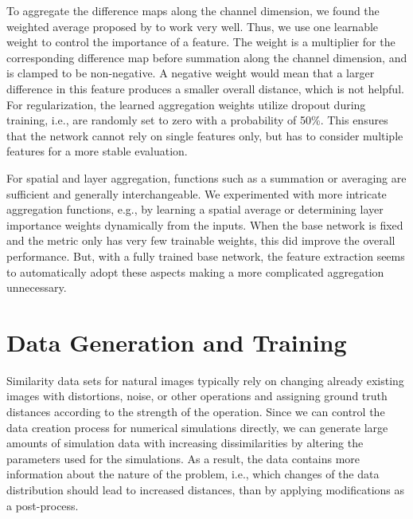 \documentclass{article}
\begin{document}
To aggregate the difference maps along the channel dimension, we found the weighted average proposed by \citeauthor{zhang2018} to work very well. Thus, we use one learnable weight to control the importance of a feature. The weight is a multiplier for the corresponding difference map before summation along the channel dimension, and is clamped to be non-negative. A negative weight would mean that a larger difference in this feature produces a smaller overall distance, which is not helpful. For regularization, the learned aggregation weights utilize dropout during training, i.e., are randomly set to zero with a probability of 50\%. This ensures that the network cannot rely on single features only, but has to consider multiple features for a more stable evaluation.

For spatial and layer aggregation, functions such as a summation or averaging are sufficient and generally interchangeable.
We experimented with more intricate aggregation functions, e.g., by learning a spatial average or determining layer importance weights dynamically from the inputs. When the base network is fixed and the metric only has very few trainable weights, this did improve the overall performance. But, with a fully trained base network, the feature extraction seems to automatically adopt these aspects making a more complicated aggregation unnecessary.




\section{Data Generation and Training} \label{sec: data}
Similarity data sets for natural images typically rely on changing already existing images with distortions, noise, or other operations and assigning ground truth distances according to the strength of the operation. Since we can control the data creation process for numerical simulations directly, we can generate large amounts of simulation data with increasing dissimilarities by altering the parameters used for the simulations. 
As a result, the data contains more information about the nature of the problem, i.e., which changes of the data distribution should lead to increased distances, than by applying modifications as a post-process.
\end{document}
